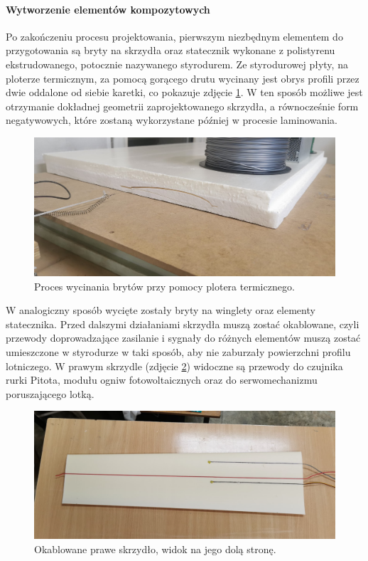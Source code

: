 \documentclass[12pt, a4paper]{article}
\begin{document}
\FloatBarrier
\paragraph{Wytworzenie elementów kompozytowych}\mbox{}

Po zakończeniu procesu projektowania, pierwszym niezbędnym elementem do przygotowania są bryty na skrzydła oraz statecznik wykonane z polistyrenu ekstrudowanego, potocznie nazywanego styrodurem. Ze styrodurowej płyty, na ploterze termicznym, za pomocą gorącego drutu wycinany jest obrys profili przez dwie oddalone od siebie karetki, co pokazuje zdjęcie \ref{fig:ploter}. W ten sposób możliwe jest otrzymanie dokładnej geometrii zaprojektowanego skrzydła, a równocześnie form negatywowych, które zostaną wykorzystane później w procesie laminowania.

\begin{figure}[ht]
    \centering
    \includegraphics[width=1\textwidth]{budowa5}
    \caption{Proces wycinania brytów przy pomocy plotera termicznego.}
    \label{fig:ploter}
\end{figure}
 
W analogiczny sposób wycięte zostały bryty na winglety oraz elementy statecznika. Przed dalszymi działaniami skrzydła muszą zostać okablowane, czyli przewody doprowadzające zasilanie i sygnały do różnych elementów muszą zostać umieszczone w styrodurze w taki sposób, aby nie zaburzały powierzchni profilu lotniczego. W prawym skrzydle (zdjęcie \ref{fig:okablowane}) widoczne są przewody do czujnika rurki Pitota, modułu ogniw fotowoltaicznych oraz do serwomechanizmu poruszającego lotką.

 \begin{figure}[ht]
    \centering
    \includegraphics[width=1\textwidth]{okablowany}
    \caption{Okablowane prawe skrzydło, widok na jego dolą stronę.}
    \label{fig:okablowane}
\end{figure}
\end{document}
